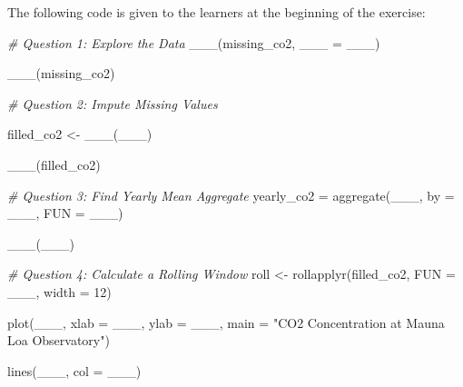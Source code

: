 \documentclass[
]{book}
\newenvironment{Shaded}{\begin{snugshade}}{\end{snugshade}}
\newcommand{\AttributeTok}[1]{\textcolor[rgb]{0.77,0.63,0.00}{#1}}
\newcommand{\CommentTok}[1]{\textcolor[rgb]{0.56,0.35,0.01}{\textit{#1}}}
\newcommand{\DecValTok}[1]{\textcolor[rgb]{0.00,0.00,0.81}{#1}}
\newcommand{\FunctionTok}[1]{\textcolor[rgb]{0.00,0.00,0.00}{#1}}
\newcommand{\NormalTok}[1]{#1}
\newcommand{\OtherTok}[1]{\textcolor[rgb]{0.56,0.35,0.01}{#1}}
\newcommand{\StringTok}[1]{\textcolor[rgb]{0.31,0.60,0.02}{#1}}
\begin{document}
The following code is given to the learners at the beginning of the exercise:

\begin{Shaded}
\begin{Highlighting}[]
\CommentTok{\# Question 1: Explore the Data}
\FunctionTok{\_\_\_}\NormalTok{(missing\_co2, }\AttributeTok{\_\_\_ =}\NormalTok{ \_\_\_)}

\FunctionTok{\_\_\_}\NormalTok{(missing\_co2)}
\end{Highlighting}
\end{Shaded}

\begin{Shaded}
\begin{Highlighting}[]
\CommentTok{\# Question 2: Impute Missing Values}

\NormalTok{filled\_co2 }\OtherTok{\textless{}{-}} \FunctionTok{\_\_\_}\NormalTok{(\_\_\_)}

\FunctionTok{\_\_\_}\NormalTok{(filled\_co2)}
\end{Highlighting}
\end{Shaded}

\begin{Shaded}
\begin{Highlighting}[]
\CommentTok{\# Question 3: Find Yearly Mean Aggregate}
\NormalTok{yearly\_co2 }\OtherTok{=} \FunctionTok{aggregate}\NormalTok{(\_\_\_,}
                       \AttributeTok{by =}\NormalTok{ \_\_\_,}
                       \AttributeTok{FUN =}\NormalTok{ \_\_\_)}

\FunctionTok{\_\_\_}\NormalTok{(\_\_\_)}
\end{Highlighting}
\end{Shaded}

\begin{Shaded}
\begin{Highlighting}[]
\CommentTok{\# Question 4: Calculate a Rolling Window}
\NormalTok{roll }\OtherTok{\textless{}{-}} \FunctionTok{rollapplyr}\NormalTok{(filled\_co2,}
                   \AttributeTok{FUN =}\NormalTok{ \_\_\_,}
                   \AttributeTok{width =} \DecValTok{12}\NormalTok{)}

\FunctionTok{plot}\NormalTok{(\_\_\_,}
     \AttributeTok{xlab =}\NormalTok{ \_\_\_,}
     \AttributeTok{ylab =}\NormalTok{ \_\_\_,}
     \AttributeTok{main =} \StringTok{"CO2 Concentration at Mauna Loa Observatory"}\NormalTok{)}

\FunctionTok{lines}\NormalTok{(\_\_\_, }\AttributeTok{col =}\NormalTok{ \_\_\_)}
\end{Highlighting}
\end{Shaded}


  
\end{document}
